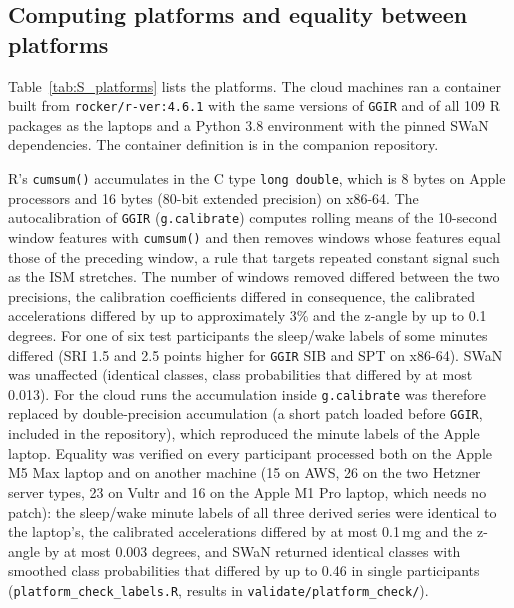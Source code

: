 \documentclass[12pt]{article}
\begin{document}
\subsection{Computing platforms and equality between platforms}
Table~\ref{tab:S_platforms} lists the platforms. The cloud machines ran a container built from \texttt{rocker/r-ver:4.6.1} with the same versions of \texttt{GGIR} and of all 109 R packages as the laptops and a Python 3.8 environment with the pinned SWaN dependencies. The container definition is in the companion repository.

R's \texttt{cumsum()} accumulates in the C type \texttt{long double}, which is 8 bytes on Apple processors and 16 bytes (80-bit extended precision) on x86-64. The autocalibration of \texttt{GGIR} (\texttt{g.calibrate}) computes rolling means of the 10-second window features with \texttt{cumsum()} and then removes windows whose features equal those of the preceding window, a rule that targets repeated constant signal such as the ISM stretches. The number of windows removed differed between the two precisions, the calibration coefficients differed in consequence, the calibrated accelerations differed by up to approximately 3\% and the z-angle by up to 0.1 degrees. For one of six test participants the sleep/wake labels of some minutes differed (SRI 1.5 and 2.5 points higher for \texttt{GGIR} SIB and SPT on x86-64). SWaN was unaffected (identical classes, class probabilities that differed by at most 0.013). For the cloud runs the accumulation inside \texttt{g.calibrate} was therefore replaced by double-precision accumulation (a short patch loaded before \texttt{GGIR}, included in the repository), which reproduced the minute labels of the Apple laptop. Equality was verified on every participant processed both on the Apple M5 Max laptop and on another machine (15 on AWS, 26 on the two Hetzner server types, 23 on Vultr and 16 on the Apple M1 Pro laptop, which needs no patch): the sleep/wake minute labels of all three derived series were identical to the laptop's, the calibrated accelerations differed by at most 0.1\,mg and the z-angle by at most 0.003 degrees, and SWaN returned identical classes with smoothed class probabilities that differed by up to 0.46 in single participants (\texttt{platform\_check\_labels.R}, results in \texttt{validate/platform\_check/}).
\end{document}
